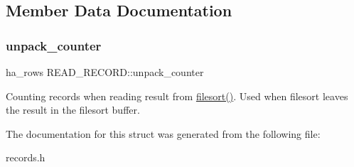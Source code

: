 \subsection{Member Data Documentation}
\mbox{\label{structREAD__RECORD_adf94307ee11b85bcb31694522cd99b5d}} 
\subsubsection{\texorpdfstring{unpack\+\_\+counter}{unpack\_counter}}
{\footnotesize\ttfamily ha\+\_\+rows R\+E\+A\+D\+\_\+\+R\+E\+C\+O\+R\+D\+::unpack\+\_\+counter}

Counting records when reading result from \mbox{\hyperlink{filesort_8cc_a953fde8362f86f7fb832e9a1e2c06530}{filesort()}}. Used when filesort leaves the result in the filesort buffer. 

The documentation for this struct was generated from the following file\+:\begin{DoxyCompactItemize}
\item 
records.\+h\end{DoxyCompactItemize}
